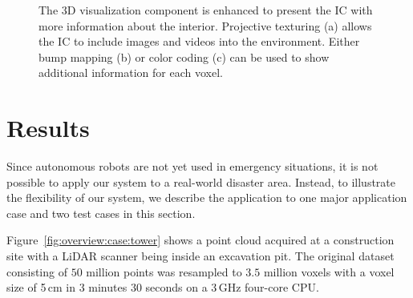 \documentclass{egpubl}
\begin{document}
\begin{figure}
{		
		\label{fig:imageenhancement:colors}
	}
	\caption{The 3D visualization component is enhanced to present the IC with more information about the interior. Projective texturing (a) allows the IC to include images and videos into the environment. Either bump mapping (b) or color coding (c) can be used to show additional information for each voxel.}
	\label{fig:imageenhancement}
\end{figure}


\section{Results} \label{sec:results}
Since autonomous robots are not yet used in emergency situations, it is not possible to apply our system to a real-world disaster area. Instead, to illustrate the flexibility of our system, we describe the application to one major application case and two test cases in this section.

 Figure~\ref{fig:overview:case:tower} shows a point cloud acquired at a construction site with a LiDAR scanner being inside an excavation pit. The original dataset consisting of $50$ million points was resampled to $3.5$ million voxels with a voxel size of 5\,cm in 3 minutes 30 seconds on a 3\,GHz four-core CPU. 
\end{document}
